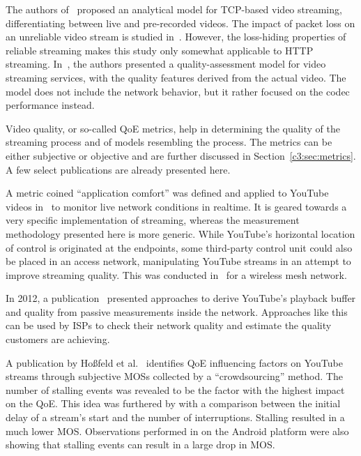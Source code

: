 The authors of~\cite{wang2003model} proposed an analytical model for \gls{TCP}-based video streaming, differentiating between live and pre-recorded videos. The impact of packet loss on an unreliable video stream is studied in~\cite{pv2010loss}. However, the loss-hiding properties of reliable streaming makes this study only somewhat applicable to \gls{HTTP} streaming. In~\cite{pv2010qoe}, the authors presented a quality-assessment model for video streaming services, with the quality features derived from the actual video. The model does not include the network behavior, but it rather focused on the codec performance instead. 

Video quality, or so-called \gls{QoE} metrics, help in determining the quality of the streaming process and of models resembling the process. The metrics can be either subjective or objective and are further discussed in Section~\ref{c3:sec:metrics}. A few select publications are already presented here.

A metric coined ``application comfort'' was defined and applied to YouTube videos in~\cite{staehle2010yomo} to monitor live network conditions in realtime. It is geared towards a very specific implementation of streaming, whereas the measurement methodology presented here is more generic. While YouTube's horizontal location of control is originated at the endpoints, some third-party control unit could also be placed in an access network, manipulating YouTube streams in an attempt to improve streaming quality. This was conducted in~\cite{5733220} for a wireless mesh network.

In 2012, a publication~\cite{6296879} presented approaches to derive YouTube's playback buffer and quality from passive measurements inside the network. Approaches like this can be used by \glspl{ISP} to check their network quality and estimate the quality customers are achieving. 

A publication by Hoßfeld et al.~\cite{6123395} identifies \gls{QoE} influencing factors on YouTube streams through subjective \glspl{MOS} collected by a ``crowdsourcing'' method. The number of stalling events was revealed to be the factor with the highest impact on the \gls{QoE}. This idea was furthered by \cite{6263849} with a comparison between the initial delay of a stream's start and the number of interruptions. Stalling resulted in a much lower \gls{MOS}. Observations performed in \cite{ketyko2010qoe} on the Android platform were also showing that stalling events can result in a large drop in \gls{MOS}. 

